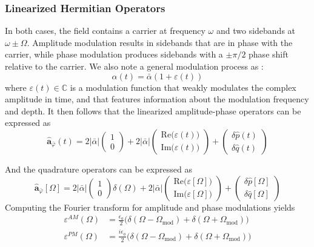 \subsubsection{Linearized Hermitian Operators}
In both cases, the field contains a carrier at frequency $\omega$ and two sidebands at $\omega \pm \Omega$. Amplitude modulation results in sidebands that are in phase with the carrier, while phase modulation produces sidebands with a $\pm \pi/2$ phase shift relative to the carrier. We also note a general modulation process as :
\begin{equation}
\alpha(t) = \bar{\alpha} \left(1 + \varepsilon(t) \right)
\end{equation}
where $\varepsilon(t) \in \mathbb{C}$ is a modulation function that weakly modulates the complex amplitude in time, and that features information about the modulation frequency and depth. It then follows that the linearized amplitude-phase operators can be expressed as
\begin{equation}
\hat{\mathbf a}_{\bar{\varphi}} (t) = 2|\bar{\alpha}| \begin{pmatrix}
  1 \\ 0 
\end{pmatrix} + 2|\bar{\alpha}|\begin{pmatrix}
  \mathrm{Re}\big(\varepsilon(t) \big) \\
  \mathrm{Im}\big(\varepsilon(t) \big)
\end{pmatrix}
+ \begin{pmatrix}
  \delta \hat{p}(t) \\
  \delta \hat{q}(t)
\end{pmatrix}
\end{equation}

And the quadrature operators can be expressed as
\begin{equation}
\hat{\mathbf a}_{\bar{\varphi}} [\Omega] =2|\bar{\alpha}| \begin{pmatrix}
  1 \\ 0 
\end{pmatrix}\delta(\Omega) + 2|\bar{\alpha}|\begin{pmatrix}
  \mathrm{Re}\big(\varepsilon[\Omega] \big) \\
  \mathrm{Im}\big(\varepsilon[\Omega] \big)
\end{pmatrix}
+ \begin{pmatrix}
  \delta \hat{p}[\Omega] \\
  \delta \hat{q}[\Omega]
\end{pmatrix}
\end{equation}
Computing the Fourier transform for amplitude and phase modulations yields
\begin{equation}
  \begin{split}
    \varepsilon^{AM}(\Omega) & = \frac{\epsilon_a}{2} \Big(\delta(\Omega - \Omega_{\text{mod}}) +\delta(\Omega + \Omega_{\text{mod}}) \Big)\\
    \varepsilon^{PM}(\Omega) & = \frac{i\epsilon_\phi}{2} \Big(\delta(\Omega - \Omega_{\text{mod}}) + \delta(\Omega + \Omega_{\text{mod}})\Big)
  \end{split}
\end{equation}

